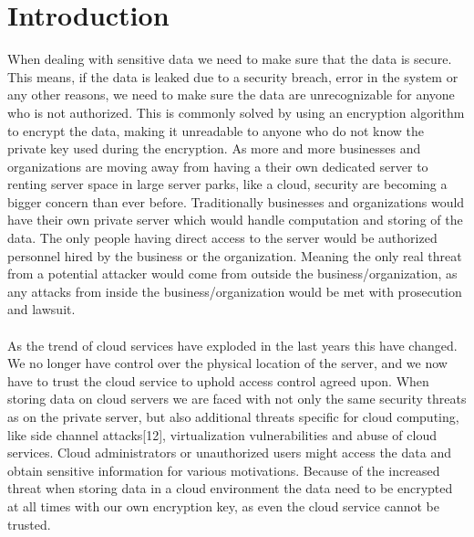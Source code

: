 \chapter{Introduction}

\begin{enumerate}

 When dealing with sensitive data we need to make sure that the data is secure. This means, if the data is leaked due to a security breach, error in the system or any other reasons, we need to make sure the data are unrecognizable for anyone who is not authorized. This is commonly solved by using an encryption algorithm to encrypt the data, making it unreadable to anyone who do not know the private key used during the encryption. As more and more businesses and organizations are moving away from having a their own dedicated server to renting server space in large server parks, like a cloud, security are becoming a bigger concern than ever before. Traditionally businesses and organizations would have their own private server which would handle computation and storing of the data. The only people having direct access to the server would be authorized personnel hired by the business or the organization. Meaning the only real threat from a potential attacker would come from outside the business/organization, as any attacks from inside the business/organization would be met with prosecution and lawsuit.
\\\\
 As the trend of cloud services have exploded in the last years this have changed. We no longer have control over the physical location of the server, and we now have to trust the cloud service to uphold access control agreed upon. When storing data on cloud servers we are faced with not only the same security threats as on the private server, but also additional threats specific for cloud computing, like side channel attacks[12], virtualization vulnerabilities and abuse of cloud services. Cloud administrators or unauthorized users might access the data and obtain sensitive information for various motivations. Because of the increased threat when storing data in a cloud environment the data need to be encrypted at all times with our own encryption key, as even the cloud service cannot be trusted.
\newpage

\end{enumerate}
